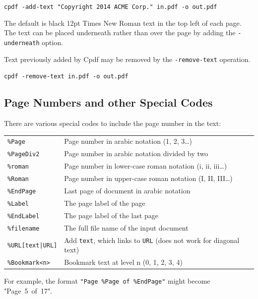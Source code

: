 \documentclass{book}
\begin{document}
  \begin{framed}
    \noindent\small\verb!cpdf -add-text "Copyright 2014 ACME Corp." in.pdf -o out.pdf!
  \end{framed}

  \noindent The default is black 12pt Times New Roman text in the top left of each page. The text can be placed underneath rather than over the page by adding the \texttt{-underneath} option.
  
  Text previously added by Cpdf may be removed by the \texttt{-remove-text} operation.

  \begin{framed}
    \noindent\small\verb!cpdf -remove-text in.pdf -o out.pdf!
  \end{framed}

  \subsection{Page Numbers and other Special Codes}
  There are various special codes to include the page number in the text:

  \vspace{2mm}
  \begin{tabular}{ll}
    \texttt{\%Page} & Page number in arabic notation (1, 2, 3\ldots) \\
    \texttt{\%PageDiv2} & Page number in arabic notation divided by two \\
    \texttt{\%roman} & Page number in lower-case roman notation (i, ii, iii\ldots) \\
    \texttt{\%Roman} & Page number in upper-case roman notation (I, II, III\ldots) \\
    \texttt{\%EndPage} & Last page of document in arabic notation \\
    \texttt{\%Label} & The page label of the page \\
    \texttt{\%EndLabel} & The page label of the last page \\
    \texttt{\%filename} & The full file name of the input document \\
    \texttt{\%URL[text|URL]} & Add \texttt{text}, which links to \texttt{URL} (does not work for diagonal text)\\
    \texttt{\%Bookmark<n>} & Bookmark text at level n (0, 1, 2, 3, 4)\\
  \end{tabular}

  \vspace{2mm}
  \noindent For example, the format \texttt{"Page~\%Page~of~\%EndPage"} might become "Page~5~of~17".
\end{document}
